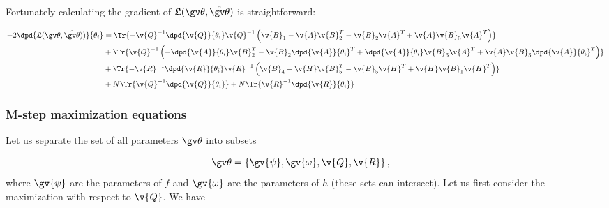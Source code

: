 Fortunately calculating the gradient of $\Lb(\Th,\hat{\Th})$ is straightforward:

\begin{align}
\begin{split}
	-2\dpd{\Lb(\Th,\hat{\Th}))}{\theta_i}
	&=\Tr{-\v{Q}^{-1}\dpd{\v{Q}}{\theta_i}\v{Q}^{-1}
	\left(\v{B}_1-\v{A}\v{B}_2^T-\v{B}_2\v{A}^T+\v{A}\v{B}_3\v{A}^T\right)}\\
	&+\Tr{\v{Q}^{-1}\left(-\dpd{\v{A}}{\theta_i}\v{B}_2^T-\v{B}_2\dpd{\v{A}}{\theta_i}^T+\dpd{\v{A}}{\theta_i}\v{B}_3\v{A}^T+\v{A}\v{B}_3\dpd{\v{A}}{\theta_i}^T\right)}\\
	&+\Tr{-\v{R}^{-1}\dpd{\v{R}}{\theta_i}\v{R}^{-1}
	\left(\v{B}_4-\v{H}\v{B}_5^T-\v{B}_5\v{H}^T+\v{H}\v{B}_1\v{H}^T\right)}\\
	&+N\Tr{\v{Q}^{-1}\dpd{\v{Q}}{\theta_i}}
	+N\Tr{\v{R}^{-1}\dpd{\v{R}}{\theta_i}}\\
	\label{eq:dLB}
\end{split}
\end{align}



\subsubsection{M-step maximization equations}

Let us separate the set of all parameters $\Th$ into
subsets

\begin{align}
	\Th&=\left\{\gv{\psi},\gv{\omega},\v{Q},\v{R}\right\},
\end{align}
where $\gv{\psi}$ are the parameters of $f$ and $\gv{\omega}$ are
the parameters of $h$ (these sets can intersect). Let us first consider
the maximization with respect to $\v{Q}$. We have

